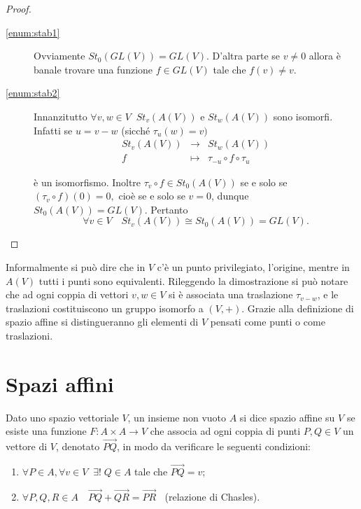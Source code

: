  \begin{proof}
 \begin{description}
	\item [\ref{enum:stab1}] Ovviamente $St_0(GL(V))=GL(V).$
 D'altra parte se $v\ne 0$ allora è banale trovare una funzione $f\in GL(V)$ tale che $f(v)\ne v.$
  
 
	\item [\ref{enum:stab2}] Innanzitutto $\forall v,w\in V\;\; St_v(A(V))$ e $St_w(A(V))$ sono isomorfi.
 Infatti se
 $u=v-w$ (sicché $\tau_u(w)=v)$
 \begin{eqnarray*}
	St_v(A(V)) &\to & St_w(A(V)) \\
	f &\mapsto & \tau_{-u}\circ f\circ\tau_u
 \end{eqnarray*}
 
 è un isomorfismo.
 Inoltre $\tau_v\circ f\in St_0(A(V))$ se e solo se $(\tau_v\circ f)(0)=0,$ cioè se e solo se $v=0$,
 dunque $St_0(A(V))=GL(V)$.
 Pertanto 
 \[ 
  \forall v\in V\quad St_v(A(V))\cong St_0(A(V))=GL(V).
 \]
 \end{description}
 
 \end{proof}
 
 
 Informalmente si può dire che in $V$ c'è un punto privilegiato, l'origine, mentre in $A(V)$ tutti i punti sono equivalenti.
 Rileggendo la dimostrazione si può notare che ad ogni coppia di vettori $v,w\in V$ si è associata una traslazione
 $\tau_{v-w}$, e le traslazioni costituiscono un gruppo isomorfo a $(V,+)$.
 Grazie alla definizione di spazio affine si distingueranno gli elementi di $V$ pensati come punti o come traslazioni.
 
 
	\section{Spazi affini}
 
 Dato uno spazio vettoriale $V$, un insieme non vuoto $A$ si dice spazio affine su $V$
 se esiste una funzione $F:A\times A\to V$ che associa ad ogni coppia di punti $P,Q\in V$ un vettore di $V$,
 denotato $\overrightarrow{PQ}$, in modo da verificare le seguenti condizioni:
 \begin{enumerate}[label=\bf\Roman*)]
	\item $\forall P\in A,\forall v\in V\;\;\exists!\; Q\in A$ tale che $\overrightarrow{PQ}=v$;
	\item $\forall P,Q,R\in A\quad\overrightarrow{PQ}+\overrightarrow{QR}=\overrightarrow{PR}\;\;$
		(relazione di Chasles).
 \end{enumerate}
 
